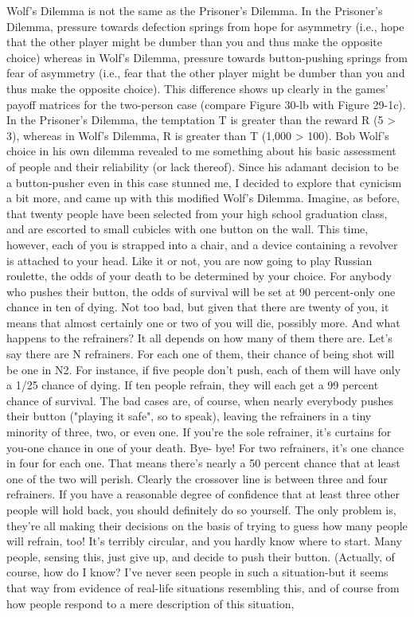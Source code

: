         Wolf's Dilemma is not the same as the Prisoner's Dilemma. In the Prisoner's
Dilemma, pressure towards defection springs from hope for asymmetry (i.e., hope that
the other player might be dumber than you and thus make the opposite choice)
whereas in Wolf's Dilemma, pressure towards button-pushing springs from fear of
asymmetry (i.e., fear that the other player might be dumber than you and thus make
the opposite choice). This difference shows up clearly in the games' payoff matrices
for the two-person case (compare Figure 30-lb with Figure 29-1c). In the Prisoner's
Dilemma, the temptation T is greater than the reward R (5 > 3), whereas in Wolf's
Dilemma, R is greater than T (1,000 > 100).
        Bob Wolf's choice in his own dilemma revealed to me something about his
basic assessment of people and their reliability (or lack thereof). Since his adamant
decision to be a button-pusher even in this case stunned me, I decided to explore that
cynicism a bit more, and came up with this modified Wolf's Dilemma.
        Imagine, as before, that twenty people have been selected from your high
school graduation class, and are escorted to small cubicles with one button on the
wall. This time, however, each of you is strapped into a chair, and a device containing
a revolver is attached to your head. Like it or not, you are now going to play Russian
roulette, the odds of your death to be determined by your choice. For anybody who
pushes their button, the odds of survival will be set at 90 percent-only one chance in
ten of dying. Not too bad, but given that there are twenty of you, it means that almost
certainly one or two of you will die, possibly more. And what happens to the
refrainers? It all depends on how many of them there are. Let's say there are N
refrainers. For each one of them, their chance of being shot will be one in N2. For
instance, if five people don't push, each of them will have only a 1/25 chance of
dying. If ten people refrain, they will each get a 99 percent chance of survival. The
bad cases are, of course, when nearly everybody pushes their button ("playing it safe",
so to speak), leaving the refrainers in a tiny minority of three, two, or even one. If
you're the sole refrainer, it's curtains for you-one chance in one of your death. Bye-
bye! For two refrainers, it's one chance in four for each one. That means there's nearly
a 50 percent chance that at least one of the two will perish.
        Clearly the crossover line is between three and four refrainers. If you have a
reasonable degree of confidence that at least three other people will hold back, you
should definitely do so yourself. The only problem is, they're all making their
decisions on the basis of trying to guess how many people will refrain, too! It's
terribly circular, and you hardly know where to start. Many people, sensing this, just
give up, and decide to push their button. (Actually, of course, how do I know? I've
never seen people in such a situation-but it seems that way from evidence of real-life
situations resembling this, and of course from how people respond to a mere
description of this situation,




